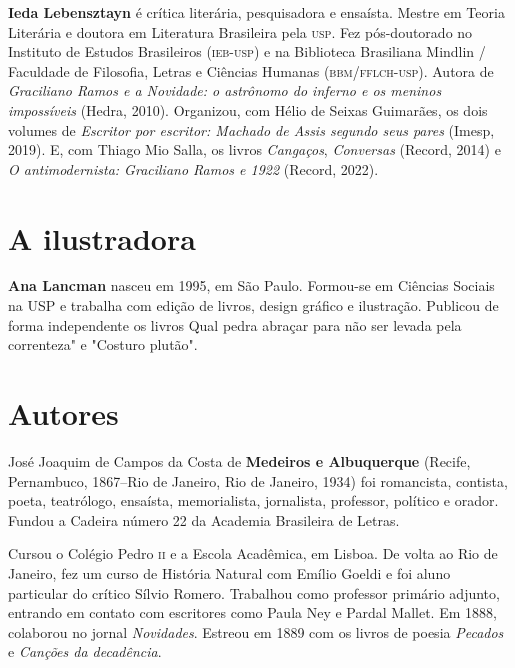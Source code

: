 \textbf{Ieda Lebensztayn} é crítica literária, pesquisadora e ensaísta. Mestre em Teoria Literária e doutora em Literatura Brasileira pela \textsc{usp}. Fez pós-doutorado no Instituto de Estudos Brasileiros (\textsc{ieb-usp}) e na Biblioteca Brasiliana Mindlin / Faculdade de Filosofia, Letras e Ciências Humanas (\textsc{bbm/fflch-usp}). Autora de \emph{Graciliano Ramos e a Novidade: o astrônomo do inferno e os meninos impossíveis} (Hedra, 2010). Organizou, com Hélio de Seixas Guimarães, os dois volumes de \emph{Escritor por escritor: Machado de Assis segundo seus pares} (Imesp, 2019). E, com Thiago Mio Salla, os livros \emph{Cangaços}, \emph{Conversas} (Record, 2014) e \emph{O antimodernista: Graciliano Ramos e 1922} (Record, 2022).

\section{A ilustradora}


\textbf{Ana Lancman} nasceu em 1995, em São Paulo. Formou-se em Ciências Sociais na USP e trabalha com edição de livros, design gráfico e ilustração. Publicou de forma independente os livros Qual pedra abraçar para não ser levada pela correnteza" e "Costuro plutão".

\section{Autores}


José Joaquim de Campos da Costa de \textbf{Medeiros e Albuquerque}
(Recife, Pernambuco, 1867--Rio de Janeiro, Rio de Janeiro, 1934) foi
romancista, contista, poeta, teatrólogo, ensaísta, memorialista,
jornalista, professor, político e orador. Fundou a Cadeira número 22 da
Academia Brasileira de Letras.

Cursou o Colégio Pedro \textsc{ii} e a Escola Acadêmica, em Lisboa. De volta ao
Rio de Janeiro, fez um curso de História Natural com Emílio Goeldi e foi
aluno particular do crítico Sílvio Romero. Trabalhou como professor
primário adjunto, entrando em contato com escritores como Paula Ney e
Pardal Mallet. Em 1888, colaborou no jornal \emph{Novidades}. Estreou em
1889 com os livros de poesia \emph{Pecados} e \emph{Canções da
decadência}.

